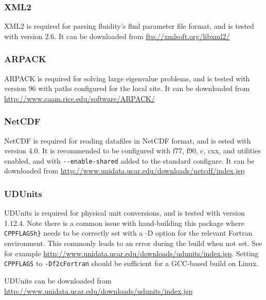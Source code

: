 \subsubsection{XML2}
\label{sect:required_libraries_supporting_xml2}

XML2 is required for parsing fluidity's flml parameter file format, and is
tested with version 2.6. It can be downloaded from \url{ftp://xmlsoft.org/libxml2/}

\subsubsection{ARPACK}
\label{sect:required_libraries_supporting_arpack}

ARPACK is required for solving large eigenvalue problems, and is tested with
version 96 with paths configured for the local site. It can be downloaded from
\url{http://www.caam.rice.edu/software/ARPACK/}

\subsubsection{NetCDF}
\label{sect:required_libraries_supporting_netcdf}

NetCDF is required for reading datafiles in NetCDF format, and is ested with
version 4.0. It is recommended to be configured with f77, f90, c, cxx, and
utilities enabled, and with \lstinline[language=bash]+--enable-shared+ added to
the standard configure. It can be downloaded from
\url{http://www.unidata.ucar.edu/downloads/netcdf/index.jsp}

\subsubsection{UDUnits}
\label{sect:required_libraries_supporting_udunits}

UDUnits is required for physical unit conversions, and is tested with version
1.12.4. Note there is a common issue with hand-building this package where
\lstinline[language=bash]+CPPFLAGSh}+ needs to be correctly set with a -D
option for the relevant Fortran environment. This commonly leads to an error
during the build when not set. See for example
\url{http://www.unidata.ucar.edu/downloads/udunits/index.jsp}.  Setting
\lstinline[language=bash]+CPPFLAGS+ to \lstinline[language=bash]+-Df2cFortran+
should be sufficient for a GCC-based build on Linux.

UDUnits can be downloaded from \url{http://www.unidata.ucar.edu/downloads/udunits/index.jsp}

